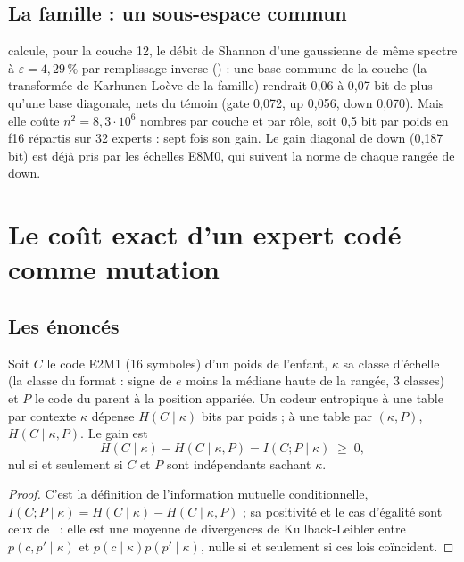 \subsection{La famille : un sous-espace commun}

 calcule, pour la couche 12, le débit de Shannon d'une gaussienne de même spectre à $\varepsilon = 4{,}29\,\%$ par remplissage inverse () \mes : une base commune de la couche (la transformée de Karhunen-Loève de la famille) rendrait 0,06 à 0,07 bit de plus qu'une base diagonale, nets du témoin (gate 0,072, up 0,056, down 0,070). Mais elle coûte $n^2 = 8{,}3\cdot10^6$ nombres par couche et par rôle, soit 0,5 bit par poids en f16 répartis sur 32 experts \calc : sept fois son gain. Le gain diagonal de down (0,187 bit) est déjà pris par les échelles E8M0, qui suivent la norme de chaque rangée de down.

\section{Le coût exact d'un expert codé comme mutation}\label{t3dup:sec:cout}

\subsection{Les énoncés}

\begin{proposition}\label{t3dup:prop:im}
Soit $C$ le code E2M1 (16 symboles) d'un poids de l'enfant, $\kappa$ sa classe d'échelle (la classe du format : signe de $e$ moins la médiane haute de la rangée, 3 classes) et $P$ le code du parent à la position appariée. Un codeur entropique à une table par contexte $\kappa$ dépense $H(C \mid \kappa)$ bits par poids ; à une table par $(\kappa, P)$, $H(C \mid \kappa, P)$. Le gain est
\begin{equation}\label{t3dup:eq:im}
H(C \mid \kappa) - H(C \mid \kappa, P) = I(C ; P \mid \kappa) \;\ge\; 0,
\end{equation}
nul si et seulement si $C$ et $P$ sont indépendants sachant $\kappa$.
\end{proposition}

\begin{proof}
C'est la définition de l'information mutuelle conditionnelle, $I(C;P\mid\kappa) = H(C\mid\kappa) - H(C\mid\kappa,P)$ ; sa positivité et le cas d'égalité sont ceux de~\cite[th. 2.6.5 et 2.5.2]{cover2006} : elle est une moyenne de divergences de Kullback-Leibler entre $p(c, p'\mid\kappa)$ et $p(c\mid\kappa)p(p'\mid\kappa)$, nulle si et seulement si ces lois coïncident.
\end{proof}

